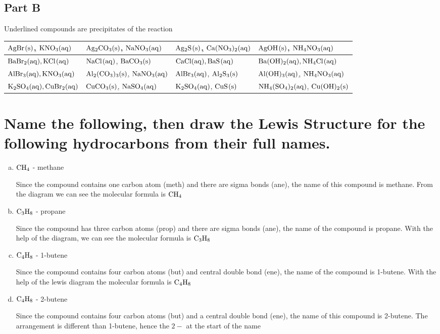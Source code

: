 \documentclass{scrartcl}
\begin{document}
\subsection{Part B}
\label{sec:org22d57d6}
Underlined compounds are precipitates of the reaction
\begin{center}
\begin{tabular}{llll}
\toprule
\uline{\(\ce{AgBr(s)}\),} \(\ce{KNO3(aq)}\) & \uline{\(\ce{Ag2CO3(s)}\)}, \(\ce{NaNO3(aq)}\) & \uline{\(\ce{Ag2S(s)}\),}  \(\ce{Ca(NO3)2(aq)}\) & \uline{\(\ce{AgOH(s)}\)}, \(\ce{NH4NO3(aq)}\)\\
\midrule
\(\ce{BaBr2(aq), KCl(aq)}\) & \(\ce{NaCl(aq)}\), \uline{\(\ce{BaCO3(s)}\)} & \(\ce{CaCl(aq), BaS(aq)}\) & \(\ce{Ba(OH)2(aq), NH4Cl(aq)}\)\\
\midrule
\(\ce{AlBr3(aq), KNO3(aq)}\) & \uline{\(\ce{Al2(CO3)3(s)}\),} \(\ce{NaNO3(aq)}\) & \(\ce{AlBr3(aq)}\), \uline{\(\ce{Al2S3(s)}\)} & \uline{\(\ce{Al(OH)3(aq)}\),} \(\ce{NH4NO3(aq)}\)\\
\midrule
\(\ce{K2SO4(aq), CuBr2(aq)}\) & \uline{\(\ce{CuCO3(s)}\),} \(\ce{NaSO4(aq)}\) & \(\ce{K2SO4(aq)}\), \uline{\(\ce{CuS(s)}\)} & \(\ce{NH4(SO4)2(aq)}\), \uline{\(\ce{Cu(OH)2(s)}\)}\\
\bottomrule
\end{tabular}
\end{center}

\section{Name the following, then draw the Lewis Structure for the following hydrocarbons from their full names.}
\label{sec:orgd13be16}
\begin{enumerate}[a.]
\item \(\ce{CH4}\) - methane

Since the compound contains one carbon atom (meth) and there are sigma bonds
(ane), the name of this compound is methane. From the diagram we can see the
molecular formula is    \(\ce{CH4}\)

\item \(\ce{C3H8}\) - propane

Since the compound has three carbon atoms (prop) and there are sigma bonds
(ane), the name of the compound is propane. With the help of the diagram, we
can see the molecular formula is    \(\ce{C3H8}\)

\item \(\ce{C4H8}\) - 1-butene

Since the compound contains four carbon atoms (but) and central double bond
(ene), the name of the compound is 1-butene. With the help of the lewis
diagram the molecular formula is \(\ce{C4H8}\)

\item \(\ce{C4H8}\) - 2-butene

Since the compound contains four carbon atoms (but) and a central double bond
(ene), the name of this compound is 2-butene. The arrangement is different
than 1-butene, hence the \(2-\) at the start of the name
\end{enumerate}
\end{document}
